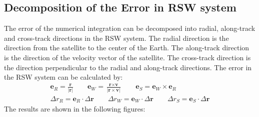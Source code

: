 \documentclass[12pt
,headinclude
,headsepline
,bibtotocnumbered
]{scrartcl}
\begin{document}
\subsection*{Decomposition of the Error in RSW system}
The error of the numerical integration can be decomposed into radial, along-track and cross-track directions in the RSW system. The radial direction is the direction from the satellite to the center of the Earth. The along-track direction is the direction of the velocity vector of the satellite. The cross-track direction is the direction perpendicular to the radial and along-track directions. The error in the RSW system can be calculated by:
\begin{align*}
    \textbf{e}_R=\frac{\textbf{r}}{|\textbf{r}|}\qquad\textbf{e}_W=\frac{\textbf{r}\times\textbf{v}}{|\textbf{r}\times\textbf{v}|}\qquad\textbf{e}_S=\textbf{e}_W\times\textbf{e}_R\\
    \Delta r_R=\textbf{e}_R\cdot\Delta\textbf{r}\qquad\Delta r_W=\textbf{e}_W\cdot\Delta\textbf{r}\qquad\Delta r_S=\textbf{e}_S\cdot\Delta\textbf{r}
\end{align*}
The results are shown in the following figures:
\end{document}
